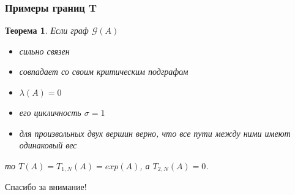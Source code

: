 \documentclass{beamer}
\newtheorem*{Th}{Теорема}
\begin{document}

\begin{frame}
\frametitle{Примеры границ T}
\begin{Th}
Если граф $\mathcal{G}(A)$ 
\begin{itemize}
\item сильно связен
\item совпадает со своим критическим подграфом
\item $\lambda(A) = 0$
\item его цикличность $\sigma = 1$
\item для произвольных двух вершин верно, что все пути между ними имеют одинаковый вес
\end{itemize}
то $T(A) = T_{1, N}(A) = exp(A)$, а $T_{2,N}(A) = 0$.
\end{Th}
\end{frame}



\begin{frame}
\begin{center}
\Huge{Спасибо за внимание!}
\end{center}
\end{frame}
\end{document}
